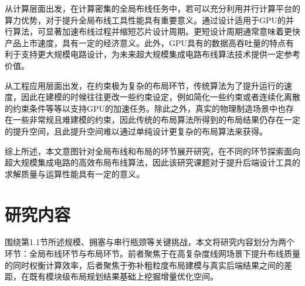 
从计算层面出发，在计算密集的全局布线任务中，若可以充分利用并行计算平台的算力优势，对于提升全局布线工具性能具有重要意义。通过设计适用于GPU的并行算法，可显著加速布线过程并缩短芯片设计周期。更短设计周期通常意味着更快产品上市速度，具有一定的经济意义。此外，GPU具有的数据高吞吐量的特点有利于支持更大规模电路设计，为未来超大规模集成电路布线算法技术提供一定参考价值。

从工程应用层面出发，在约束极为复杂的布局环节，传统算法为了提升运行的速度，因此在建模的时候往往更改一些约束设定，例如简化一些约束或者连续化离散的约束条件等等以支持GPU的加速任务。除此之外，真实的物理制造场景中也存在一些非常规且难建模的约束，因此传统的布局算法所得到的布局结果仍存在一定的提升空间，且此提升空间难以通过单纯设计更复杂的布局算法来获得。


综上所述，本文意图针对全局布线和布局的环节展开研究，在不同的环节探索面向超大规模集成电路的高效布局布线算法，因此该研究课题对于提升后端设计工具的求解质量与运算性能具有一定的意义。%

\section{研究内容}
\label{sec:research_content}

围绕第1.1节所述规模、拥塞与串行瓶颈等关键挑战，本文将研究内容划分为两个环节：全局布线环节与布局环节。前者聚焦于在高复杂度线网场景下提升布线质量的同时权衡计算效率，后者聚焦于弥补粗粒度布局建模与真实后端结果之间的差距，在既有模块级布局规划结果基础上挖掘增量优化空间。

